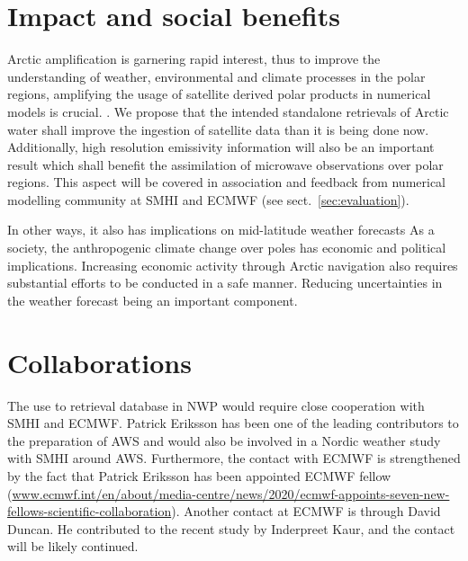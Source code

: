 \documentclass[12pt,oneside,a4paper]{article}
\begin{document}
\section{Impact and social benefits}
%
\label{sec:impact}
Arctic amplification is garnering rapid interest, thus to improve the understanding of weather, environmental and climate processes in the polar regions, amplifying the usage of satellite derived polar products in numerical models is crucial. . We propose that the intended standalone retrievals of Arctic water shall improve the ingestion of satellite data than it is being done now. Additionally, high resolution emissivity information will also be an important result which shall benefit the assimilation of microwave observations over polar regions. This aspect will be covered in association and feedback from numerical modelling community at SMHI and ECMWF (see sect.~\ref{sec:evaluation}).


In other ways, it also has implications on mid-latitude weather forecasts
As a society, the anthropogenic climate change over poles has economic and political implications. Increasing economic activity through Arctic navigation also requires substantial efforts to be conducted in a safe manner. Reducing uncertainties in the weather forecast being an important component. 

\section{Collaborations}
%
The use to retrieval database in NWP would require close cooperation with SMHI and ECMWF. Patrick Eriksson has been one of the leading contributors to the preparation of AWS and would also be involved in a Nordic weather study with SMHI around AWS. Furthermore, the contact with ECMWF is strengthened by the fact that Patrick Eriksson has been appointed ECMWF  fellow ({\footnotesize \url{www.ecmwf.int/en/about/media-centre/news/2020/ecmwf-appoints-seven-new-fellows-scientific-collaboration}}). Another contact at ECMWF is through David Duncan. He contributed to the recent study by Inderpreet Kaur, and the contact will be likely continued. 
\end{document}
